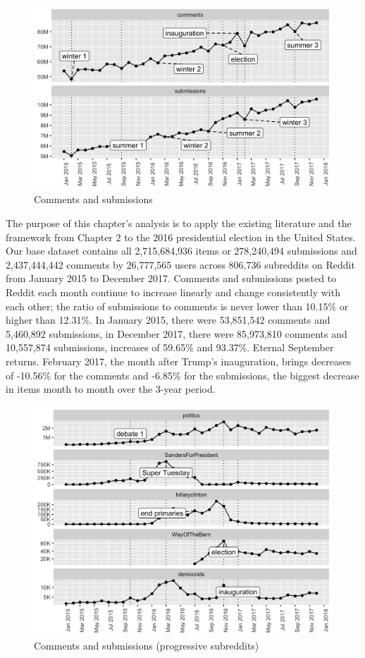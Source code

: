 \documentclass[doublespacing]{utdthesis}
\begin{document}
\begin{figure}[!ht]
\centering
\includegraphics[width=\textwidth]{things}
\caption{Comments and submissions}
\end{figure}

The purpose of this chapter's analysis is to apply the existing literature and the framework from Chapter 2 to the 2016 presidential election in the United States.
Our base dataset contains all 2,715,684,936 items or 278,240,494 submissions and 2,437,444,442 comments by 26,777,565 users across 806,736 subreddits on Reddit from January 2015 to December 2017.
Comments and submissions posted to Reddit each month continue to increase linearly and change consistently with each other; the ratio of submissions to comments is never lower than 10.15\% or higher than 12.31\%.
In January 2015, there were 53,851,542 comments and 5,460,892 submissions, in December 2017, there were 85,973,810 comments and 10,557,874 submissions, increases of 59.65\% and 93.37\%.
Eternal September returns.
February 2017, the month after Trump's inauguration, brings decreases of -10.56\% for the comments and -6.85\% for the submissions, the biggest decrease in items month to month over the 3-year period.
 
\begin{figure}[!ht]
\centering
\includegraphics[width=\textwidth]{2016/progressive_count}
\caption{Comments and submissions (progressive subreddits)}
\label{fig:progressive_count}
\end{figure}
\end{document}
